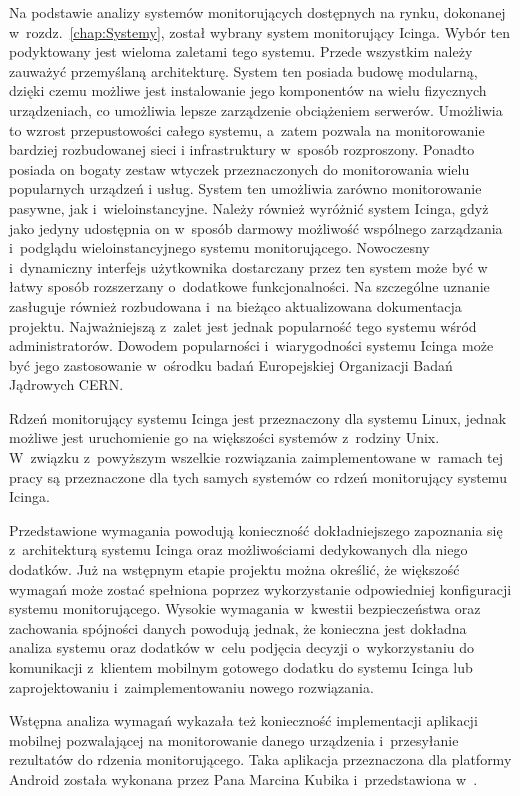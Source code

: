 Na podstawie analizy systemów monitorujących dostępnych na rynku,
dokonanej w~rozdz.~\ref{chap:Systemy}, został wybrany system
monitorujący Icinga. Wybór ten podyktowany jest wieloma zaletami tego
systemu. Przede wszystkim należy zauważyć przemyślaną
architekturę. System ten posiada budowę modularną, dzięki czemu
możliwe jest instalowanie jego komponentów na wielu fizycznych
urządzeniach, co umożliwia lepsze zarządzenie obciążeniem
serwerów. Umożliwia to wzrost przepustowości całego systemu, a~zatem
pozwala na monitorowanie bardziej rozbudowanej sieci i infrastruktury
w~sposób rozproszony. Ponadto posiada on bogaty zestaw wtyczek
przeznaczonych do monitorowania wielu popularnych urządzeń i
usług. System ten umożliwia zarówno monitorowanie pasywne, jak
i~wieloinstancyjne. Należy również wyróżnić system Icinga, gdyż jako
jedyny udostępnia on w~sposób darmowy możliwość wspólnego zarządzania
i~podglądu wieloinstancyjnego systemu monitorującego. Nowoczesny
i~dynamiczny interfejs użytkownika dostarczany przez ten system może
być w łatwy sposób rozszerzany o~dodatkowe funkcjonalności. Na
szczególne uznanie zasługuje również rozbudowana i~na bieżąco
aktualizowana dokumentacja projektu. Najważniejszą z~zalet jest jednak
popularność tego systemu wśród administratorów. Dowodem popularności
i~wiarygodności systemu Icinga może być jego zastosowanie w~ośrodku
badań Europejskiej Organizacji Badań Jądrowych
CERN\cite{www:IcingaCern}.

Rdzeń monitorujący systemu Icinga jest przeznaczony dla systemu Linux,
jednak możliwe jest uruchomienie go na większości systemów z~rodziny
Unix. W~związku z~powyższym wszelkie rozwiązania zaimplementowane
w~ramach tej pracy są przeznaczone dla tych samych systemów co rdzeń
monitorujący systemu Icinga.

Przedstawione wymagania powodują konieczność dokładniejszego
zapoznania się z~architekturą systemu Icinga oraz możliwościami
dedykowanych dla niego dodatków. Już na wstępnym etapie projektu można
określić, że większość wymagań może zostać spełniona poprzez
wykorzystanie odpowiedniej konfiguracji systemu
monitorującego. Wysokie wymagania w~kwestii bezpieczeństwa oraz
zachowania spójności danych powodują jednak, że konieczna jest
dokładna analiza systemu oraz dodatków w~celu podjęcia decyzji
o~wykorzystaniu do komunikacji z~klientem mobilnym gotowego dodatku do
systemu Icinga lub zaprojektowaniu i~zaimplementowaniu nowego
rozwiązania.

Wstępna analiza wymagań wykazała też konieczność implementacji
aplikacji mobilnej pozwalającej na monitorowanie danego urządzenia
i~przesyłanie rezultatów do rdzenia monitorującego. Taka aplikacja
przeznaczona dla platformy Android została wykonana przez Pana Marcina
Kubika i~przedstawiona w~\cite{book:pracaKubika}.
